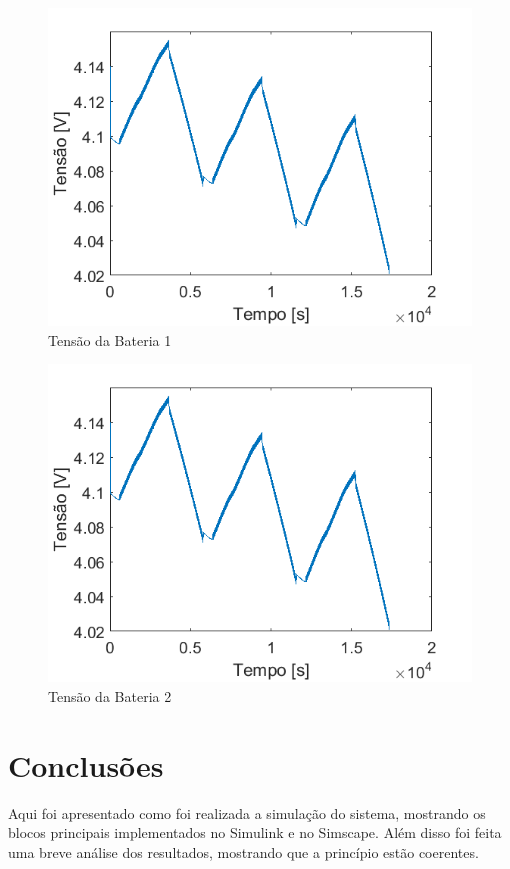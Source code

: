 \begin{figure}[!htpb]
\begin{center}
\includegraphics[scale=0.5]{figures/simulatedBatteryVoltage1.png}
\caption{Tensão da Bateria 1}
\label{figura_simulacao_tensao_bat1}
\end{center}
\end{figure}

\begin{figure}[!htpb]
\begin{center}
\includegraphics[scale=0.5]{figures/simulatedBatteryVoltage2.png}
\caption{Tensão da Bateria 2}
\label{figura_simulacao_tensao_bat2}
\end{center}
\end{figure}

\section{Conclusões}

Aqui foi apresentado como foi realizada a simulação do sistema, mostrando os blocos principais implementados no Simulink e no Simscape. Além disso foi feita uma breve análise dos resultados, mostrando que a princípio estão coerentes.
